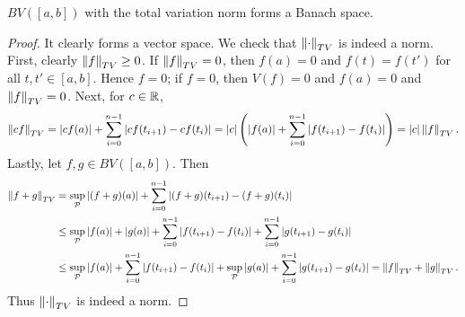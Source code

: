 \begin{proposition}
    $BV([a,b])$ with the total variation norm forms a Banach space.
\end{proposition}
\begin{proof}
    It clearly forms a vector space. We check that $\left\lVert {\cdot} \right\rVert_{TV}$ 
    is indeed a norm. First, clearly $\left\lVert {f} \right\rVert_{TV}\geq 0$. If 
    $\left\lVert {f} \right\rVert_{TV} = 0$, then $f(a) = 0$ and $f(t) = f(t')$ for all 
    $t,t'\in[a,b]$. Hence $f = 0$; if $f = 0$, then $V(f) = 0$ and 
    $f(a) = 0$ and $\left\lVert {f} \right\rVert_{TV} = 0$. Next, for $c\in\mathbb{R}$, 
    \begin{equation*}
        \norm{cf}_{TV} = \abs{cf(a)} + \sum_{i=0}^{n-1} \abs{cf(t_{i+1})-cf(t_i)} 
        = \abs{c}\pth{\abs{f(a)} + \sum_{i=0}^{n-1} \abs{f(t_{i+1})-f(t_i)}}
        = \abs{c}\norm{f}_{TV}.
    \end{equation*}
    Lastly, let $f,g\in BV([a,b])$. Then 
    \begin{equation*}
        \begin{split}
            \left\lVert {f+g} \right\rVert_{TV} 
            &= \sup_{\mathcal{P}} \left\lvert {(f+g)(a)} \right\rvert + \sum_{i=0}^{n-1} \left\lvert {(f+g)(t_{i+1})-(f+g)(t_i)} \right\rvert \\ 
            &\leq \sup_{\mathcal{P}} \left\lvert {f(a)} \right\rvert + \left\lvert {g(a)} \right\rvert + \sum_{i=0}^{n-1} \left\lvert {f(t_{i+1})-f(t_i)} \right\rvert + \sum_{i=0}^{n-1} \left\lvert {g(t_{i+1})-g(t_i)} \right\rvert \\
            &\leq \sup_{\mathcal{P}} \left\lvert {f(a)} \right\rvert + \sum_{i=0}^{n-1} \left\lvert {f(t_{i+1})-f(t_i)} \right\rvert + \sup_{\mathcal{P}} \left\lvert {g(a)} \right\rvert + \sum_{i=0}^{n-1} \left\lvert {g(t_{i+1})-g(t_i)} \right\rvert  
            = \left\lVert {f} \right\rVert_{TV} + \left\lVert {g} \right\rVert_{TV}.
        \end{split}
    \end{equation*}
    Thus $\left\lVert {\cdot} \right\rVert_{TV}$ is indeed a norm. 


\end{proof}
